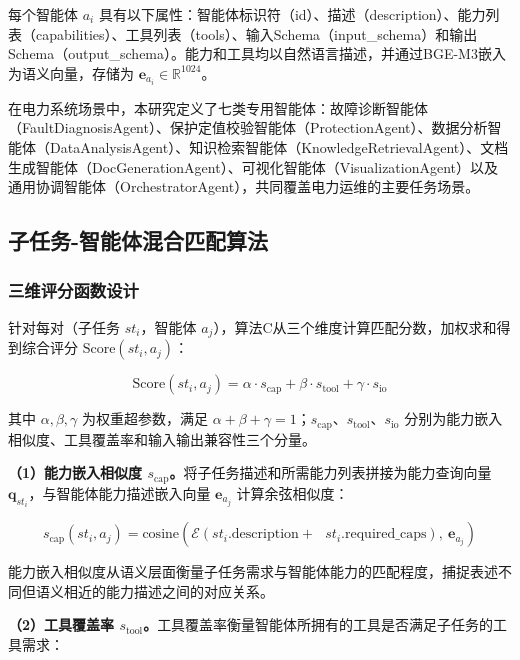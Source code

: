 每个智能体 $a_i$ 具有以下属性：智能体标识符（id）、描述（description）、能力列表（capabilities）、工具列表（tools）、输入Schema（input\_schema）和输出Schema（output\_schema）。能力和工具均以自然语言描述，并通过BGE-M3嵌入为语义向量，存储为 $\mathbf{e}_{a_i} \in \mathbb{R}^{1024}$。

在电力系统场景中，本研究定义了七类专用智能体：故障诊断智能体（FaultDiagnosisAgent）、保护定值校验智能体（ProtectionAgent）、数据分析智能体（DataAnalysisAgent）、知识检索智能体（KnowledgeRetrievalAgent）、文档生成智能体（DocGenerationAgent）、可视化智能体（VisualizationAgent）以及通用协调智能体（OrchestratorAgent），共同覆盖电力运维的主要任务场景。

\subsection{子任务-智能体混合匹配算法}

\subsubsection{三维评分函数设计}

针对每对（子任务 $st_i$，智能体 $a_j$），算法C从三个维度计算匹配分数，加权求和得到综合评分 $\text{Score}(st_i, a_j)$：

\begin{equation}
\text{Score}(st_i, a_j) = \alpha \cdot s_{\text{cap}} + \beta \cdot s_{\text{tool}} + \gamma \cdot s_{\text{io}}
\end{equation}

其中 $\alpha, \beta, \gamma$ 为权重超参数，满足 $\alpha + \beta + \gamma = 1$；$s_{\text{cap}}$、$s_{\text{tool}}$、$s_{\text{io}}$ 分别为能力嵌入相似度、工具覆盖率和输入输出兼容性三个分量。

\textbf{（1）能力嵌入相似度 $s_{\text{cap}}$。}将子任务描述和所需能力列表拼接为能力查询向量 $\mathbf{q}_{st_i}$，与智能体能力描述嵌入向量 $\mathbf{e}_{a_j}$ 计算余弦相似度：

\begin{equation}
s_{\text{cap}}(st_i, a_j) = \text{cosine}\left(\mathcal{E}(st_i.\text{description} + \text{ } st_i.\text{required\_caps}),\ \mathbf{e}_{a_j}\right)
\end{equation}

能力嵌入相似度从语义层面衡量子任务需求与智能体能力的匹配程度，捕捉表述不同但语义相近的能力描述之间的对应关系。

\textbf{（2）工具覆盖率 $s_{\text{tool}}$。}工具覆盖率衡量智能体所拥有的工具是否满足子任务的工具需求：

